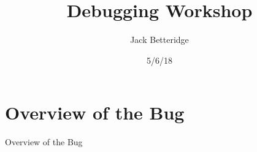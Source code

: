 \documentclass[pdf,aspectratio=43]{beamer}
\title{Debugging Workshop}
\subtitle{}
\author[Jack Betteridge]{
	Jack Betteridge\\
}
\date{5/6/18}
\theoremstyle{plain}
\theoremstyle{definition}
\theoremstyle{remark}
\theoremstyle{proof}
\begin{document}
\section{Overview of the Bug}
\begin{frame}{Overview of the Bug}

\end{frame}
\end{document}
